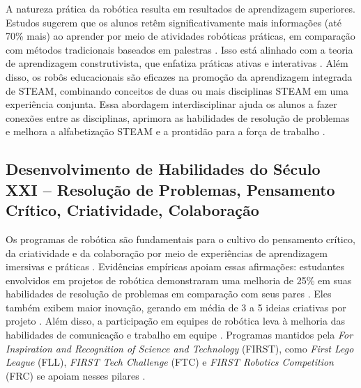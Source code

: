 \documentclass[%
  a4paper,%
  12pt,%
  fleqn,%
  english,%
  brazilian,%
]{article}
\begin{document}
A natureza prática da robótica resulta em resultados de aprendizagem superiores. Estudos sugerem que os alunos retêm significativamente mais informações (até 70\% mais) ao aprender por meio de atividades robóticas práticas, em comparação com métodos tradicionais baseados em palestras \cite{acebottImportanceRobotics2025}. Isso está alinhado com a teoria de aprendizagem construtivista, que enfatiza práticas ativas e interativas \cite{ross2024BeyondExhibits}. Além disso, os robôs educacionais são eficazes na promoção da aprendizagem integrada de STEAM, combinando conceitos de duas ou mais disciplinas STEAM em uma experiência conjunta. Essa abordagem interdisciplinar ajuda os alunos a fazer conexões entre as disciplinas, aprimora as habilidades de resolução de problemas e melhora a alfabetização STEAM e a prontidão para a força de trabalho \cite{ross2024BeyondExhibits}.

\subsection{Desenvolvimento de Habilidades do Século XXI -- Resolução de Problemas, Pensamento Crítico, Criatividade, Colaboração}

Os programas de robótica são fundamentais para o cultivo do pensamento crítico, da criatividade e da colaboração por meio de experiências de aprendizagem imersivas e práticas \cite{meegleYouthRobotics2025}. Evidências empíricas apoiam essas afirmações: estudantes envolvidos em projetos de robótica demonstraram uma melhoria de 25\% em suas habilidades de resolução de problemas em comparação com seus pares \cite{acebottImportanceRobotics2025}. Eles também exibem maior inovação, gerando em média de 3 a 5 ideias criativas por projeto \cite{acebottImportanceRobotics2025}. Além disso, a participação em equipes de robótica leva à melhoria das habilidades de comunicação e trabalho em equipe \cite{acebottImportanceRobotics2025}. Programas mantidos pela \textit{For Inspiration and Recognition of Science and Technology} (FIRST), como \textit{First Lego League} (FLL), \textit{FIRST Tech Challenge} (FTC) e \textit{FIRST Robotics Competition} (FRC) se apoiam nesses pilares \cite{firstRobotics2025}.
\end{document}
